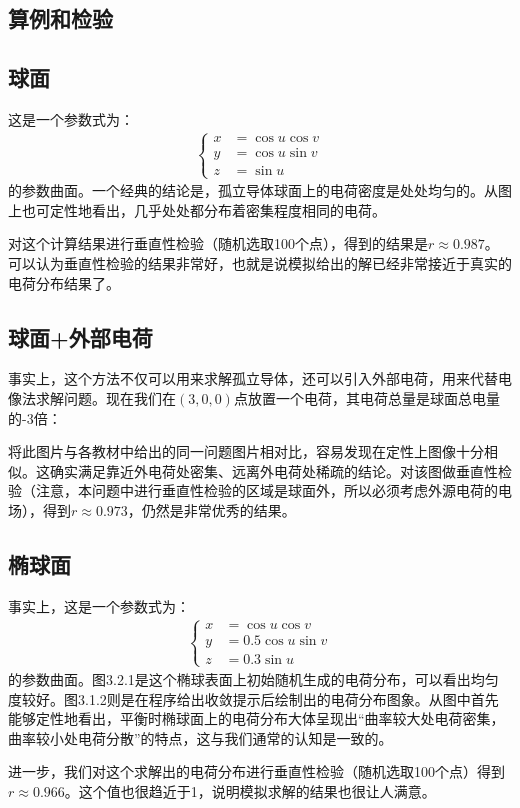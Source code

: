 \documentclass[UTF8]{article}
\numberwithin{figure}{subsection}
\numberwithin{table}{subsection}
\begin{document}
\begin{multicols}{2}
        \section{算例和检验}
        \subsection{球面}
        
        这是一个参数式为：
        \begin{align}
            \left\{
            \begin{aligned}
                x&=\cos u \cos v \\
                y&=\cos u \sin v  \\
                z&=\sin u
            \end{aligned}   
            \right.
        \end{align}
        的参数曲面。一个经典的结论是，孤立导体球面上的电荷密度是处处均匀的。从图上也可定性地看出，几乎处处都分布着密集程度相同的电荷。
        \par 对这个计算结果进行垂直性检验（随机选取100个点），得到的结果是$r\approx 0.987$。可以认为垂直性检验的结果非常好，也就是说模拟给出的解已经非常接近于真实的电荷分布结果了。
        \subsection{球面+外部电荷}
        事实上，这个方法不仅可以用来求解孤立导体，还可以引入外部电荷，用来代替电像法求解问题。现在我们在$(3,0,0)$点放置一个电荷，其电荷总量是球面总电量的-3倍：
        
        \par 将此图片与各教材中给出的同一问题图片相对比，容易发现在定性上图像十分相似。这确实满足靠近外电荷处密集、远离外电荷处稀疏的结论。对该图做垂直性检验（注意，本问题中进行垂直性检验的区域是球面外，所以必须考虑外源电荷的电场），得到$r\approx 0.973$，仍然是非常优秀的结果。
    
        \subsection{椭球面}
        
        
        事实上，这是一个参数式为：
        \begin{align}
            \left\{
            \begin{aligned}
                x&=\cos u \cos v \\
                y&=0.5\cos u \sin v  \\
                z&=0.3\sin u
            \end{aligned}   
            \right.
        \end{align}
        的参数曲面。图3.2.1是这个椭球表面上初始随机生成的电荷分布，可以看出均匀度较好。图3.1.2则是在程序给出收敛提示后绘制出的电荷分布图象。从图中首先能够定性地看出，平衡时椭球面上的电荷分布大体呈现出“曲率较大处电荷密集，曲率较小处电荷分散”的特点，这与我们通常的认知是一致的。
        \par 进一步，我们对这个求解出的电荷分布进行垂直性检验（随机选取100个点）得到$r\approx 0.966$。这个值也很趋近于1，说明模拟求解的结果也很让人满意。

\end{multicols}
\end{document}
